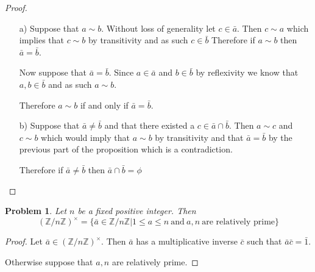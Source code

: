 \documentclass[10pt]{article}
\newcommand{\sk}{\vskip 10mm}
\newcommand{\bb}[1]{\mathbb{#1}}
\theoremstyle{plain}
\newtheorem{problem}{Problem}
\theoremstyle{remark}
\begin{document}
\begin{proof}\ \\
  \begin{itemize}
  \item[a)] Suppose that $a\sim b$. Without loss of generality let $c\in\bar{a}$. Then
    $c\sim a$ which implies that $c\sim b$ by transitivity and as such $c\in\bar{b}$
    Therefore if $a\sim b$ then $\bar{a}=\bar{b}$.

    Now suppose that $\bar{a}=\bar{b}$. Since $a\in\bar{a}$ and $b\in\bar{b}$ by
    reflexivity we know that $a,b\in\bar{b}$ and as such $a\sim b$.

    Therefore $a\sim b$ if and only if $\bar{a}=\bar{b}$.
  \item[b)] Suppose that $\bar{a}\neq\bar{b}$ and that there existed a
    $c\in \bar{a}\cap\bar{b}$. Then $a\sim c$ and $c\sim b$ which would imply that
    $a\sim b$ by transitivity and that $\bar{a}=\bar{b}$ by the previous part of the
    proposition which is a contradiction.

    Therefore if $\bar{a}\neq\bar{b}$ then $\bar{a}\cap\bar{b}=\phi$
  \end{itemize}
\end{proof}

\sk

\begin{problem}
  Let $n$ be a fixed positive integer. Then
  \[ (\bb{Z}/n\bb{Z})^\times = \{ \bar{a}\in \bb{Z}/n\bb{Z}|1\leq a\leq n\ \text{and}\ a,n\ \text{are relatively prime}\}\]
\end{problem}

\begin{proof}
  Let $\bar{a}\in(\bb{Z}/n\bb{Z})^\times$. Then $\bar{a}$ has a multiplicative inverse
  $\bar{c}$ such that $\bar{a}\bar{c}=\bar{1}$.

  Otherwise suppose that $a,n$ are relatively prime.
\end{proof}

\end{document}
